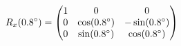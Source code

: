 \documentclass[preview]{standalone}
\begin{document}
\begin{align*}
\special{dvisvgm:raw <g id='unique000'>}R_x(0.8^\circ) = \begin{pmatrix} 1 & 0 & 0 \\ 0 & \cos(0.8^\circ) & -\sin(0.8^\circ) \\ 0 & \sin(0.8^\circ) & \cos(0.8^\circ) \end{pmatrix}\special{dvisvgm:raw </g>}
\end{align*}
\end{document}
